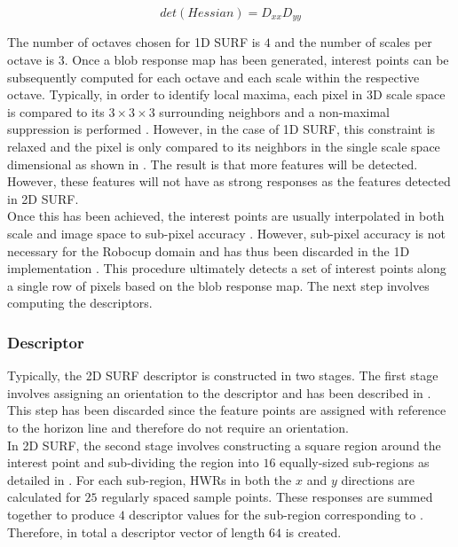 \documentclass{article}
\begin{document}
\begin{equation}
det(Hessian) = D_{xx}D_{yy}
\label{eqn:reducedHessian}
\end{equation} 

The number of octaves chosen for 1D SURF is $4$ and the number of scales per octave is $3$. Once a blob response map has been generated, interest points can be subsequently computed for each octave and each scale within the respective octave. Typically, in order to identify local maxima, each pixel in 3D scale space is compared to its $3 \times 3 \times 3$ surrounding neighbors and a non-maximal suppression is performed \cite{Evans2009}. However, in the case of 1D SURF, this constraint is relaxed and the pixel is only compared to its neighbors in the single scale space dimensional as shown in  \cite{Anderson}. The result is that more features will be detected. However, these features will not have as strong responses as the features detected in 2D SURF.\\

Once this has been achieved, the interest points are usually interpolated in both scale and image space to sub-pixel accuracy \cite{Evans2009}. However, sub-pixel accuracy is not necessary for the Robocup domain and has thus been discarded in the 1D implementation \cite{Anderson}. This procedure ultimately detects a set of interest points along a single row of pixels based on the blob response map. The next step involves computing the descriptors.\\  

\subsubsection{Descriptor}
\label{sec:1dsurfDescribe}
Typically, the 2D SURF descriptor is constructed in two stages. The first stage involves assigning an orientation to the descriptor and has been described in . This step has been discarded since the feature points are assigned with reference to the horizon line and therefore do not require an orientation.\\

In 2D SURF, the second stage involves constructing a square region around the interest point and sub-dividing the region into $16$ equally-sized sub-regions as detailed in . For each sub-region, HWRs in both the $x$ and $y$ directions are calculated for $25$ regularly spaced sample points. These responses are summed together to produce $4$ descriptor values for the sub-region corresponding to . Therefore, in total a descriptor vector of length $64$ is created.\\
\end{document}
